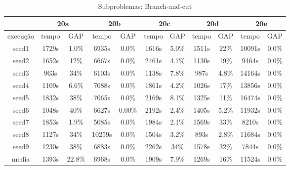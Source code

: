 \documentclass[12pt]{article}
\begin{document}
\begin{table}[!htb]
\centering
\footnotesize
\begin{tabular}{|c|c|c|c|c|c|c|c|c|c|c|}
\cline{2-11}
\multicolumn{1}{c}{} & \multicolumn{2}{|c}{20a} & \multicolumn{2}{|c}{20b} & \multicolumn{2}{|c}{20c} & \multicolumn{2}{|c}{20d} & \multicolumn{2}{|c|}{20e}  \\
\hline
execu\c{c}\~ao & tempo & GAP & tempo & GAP & tempo & GAP & tempo & GAP & tempo & GAP \\
\hline
seed1 & 1729s & 1.0\% & 6935s & 0.0\% & 1616s & 5.0\% & 1511s & 22\% & 10091s & 0.0\% \\
seed2 & 1652s & 12\% & 6667s & 0.0\% & 2461s & 4.7\% & 1130s & 19\% & 9464s & 0.0\% \\
seed3 & 963s & 34\% & 6103s & 0.0\% & 1138s & 7.8\% & 987s & 4.8\% & 14164s & 0.0\% \\
seed4 & 1109s & 6.6\% & 7088s & 0.0\% & 1861s & 4.2\% & 1026s & 17\% & 13856s & 0.0\% \\
seed5 & 1832s & 38\% & 7065s & 0.0\% & 2169s & 8.1\% & 1325s & 11\% & 16474s & 0.0\% \\
seed6 & 1048s & 40\% & 6627s & 0.00\% & 2192s & 2.4\% & 1405s & 5.2\% & 11932s & 0.0\% \\
seed7 & 1853s & 1.9\% & 5085s & 0.0\% & 1984s & 2.1\% & 1569s & 33\% & 8210s & 0.0\% \\
seed8 & 1127s & 34\% & 10259s & 0.0\% & 1504s & 3.2\% & 893s & 2.8\% & 11684s & 0.0\% \\
seed9 & 1230s & 38\% & 6883s & 0.0\% & 2262s & 34\% & 1578s & 32\% & 7844s & 0.0\% \\
\hline
\hline
media & 1393s & 22.8\% & 6968s & 0.0\% & 1909s & 7.9\% & 1269s & 16\% & 11524s & 0.0\% \\
\hline
\end{tabular}
\caption{Subproblemas: Branch-and-cut}
\end{table}
\end{document}

